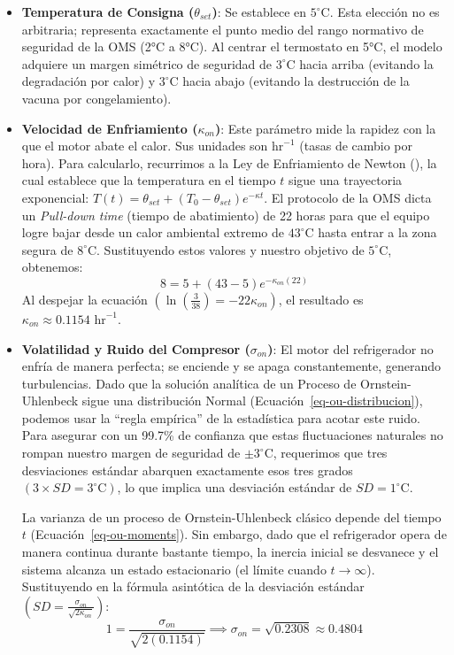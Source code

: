 \documentclass[
  spanish,
  us-letterpaper,
]{scrreprt}
\numberwithin{equation}{section}
\theoremstyle{plain}
\theoremstyle{plain}
\theoremstyle{plain}
\theoremstyle{definition}
\theoremstyle{remark}
\begin{document}
\begin{itemize}
\item
  \textbf{Temperatura de Consigna (\(\theta_{set}\))}: Se establece en
  \textbf{\(5^\circ \text{C}\)}. Esta elección no es arbitraria;
  representa exactamente el punto medio del rango normativo de seguridad
  de la OMS (2°C a 8°C). Al centrar el termostato en 5°C, el modelo
  adquiere un margen simétrico de seguridad de \(3^\circ \text{C}\)
  hacia arriba (evitando la degradación por calor) y
  \(3^\circ \text{C}\) hacia abajo (evitando la destrucción de la vacuna
  por congelamiento).
\item
  \textbf{Velocidad de Enfriamiento (\(\kappa_{on}\))}: Este parámetro
  mide la rapidez con la que el motor abate el calor. Sus unidades son
  \(\text{hr}^{-1}\) (tasas de cambio por hora). Para calcularlo,
  recurrimos a la Ley de Enfriamiento de Newton
  (), la cual establece
  que la temperatura en el tiempo \(t\) sigue una trayectoria
  exponencial:
  \(T(t) = \theta_{set} + (T_0 - \theta_{set}) e^{-\kappa t}\). El
  protocolo de la OMS dicta un \emph{Pull-down time} (tiempo de
  abatimiento) de 22 horas para que el equipo logre bajar desde un calor
  ambiental extremo de \(43^\circ \text{C}\) hasta entrar a la zona
  segura de \(8^\circ \text{C}\). Sustituyendo estos valores y nuestro
  objetivo de \(5^\circ \text{C}\), obtenemos:
  \[8 = 5 + (43 - 5) e^{-\kappa_{on} (22)}\] Al despejar la ecuación
  \(\left(\ln\left(\frac{3}{38}\right) = -22 \kappa_{on}\right)\), el
  resultado es \textbf{\(\kappa_{on} \approx 0.1154 \text{ hr}^{-1}\)}.
\item
  \textbf{Volatilidad y Ruido del Compresor (\(\sigma_{on}\))}: El motor
  del refrigerador no enfría de manera perfecta; se enciende y se apaga
  constantemente, generando turbulencias. Dado que la solución analítica
  de un Proceso de Ornstein-Uhlenbeck sigue una distribución Normal
  (Ecuación~\ref{eq-ou-distribucion}), podemos usar la ``regla
  empírica'' de la estadística para acotar este ruido. Para asegurar con
  un 99.7\% de confianza que estas fluctuaciones naturales no rompan
  nuestro margen de seguridad de \(\pm 3^\circ \text{C}\), requerimos
  que tres desviaciones estándar abarquen exactamente esos tres grados
  \(\left( 3 \times SD = 3^\circ \text{C}\right)\), lo que implica una
  desviación estándar de \(SD = 1^\circ \text{C}\).

  La varianza de un proceso de Ornstein-Uhlenbeck clásico depende del
  tiempo \(t\) (Ecuación~\ref{eq-ou-moments}). Sin embargo, dado que el
  refrigerador opera de manera continua durante bastante tiempo, la
  inercia inicial se desvanece y el sistema alcanza un estado
  estacionario (el límite cuando \(t \to \infty\)). Sustituyendo en la
  fórmula asintótica de la desviación estándar
  \(\left(SD = \frac{\sigma_{on}}{\sqrt{2\kappa_{on}}}\right)\):
  \[1 = \frac{\sigma_{on}}{\sqrt{2(0.1154)}} \implies \sigma_{on} = \sqrt{0.2308} \approx 0.4804\]
\end{itemize}
\end{document}
